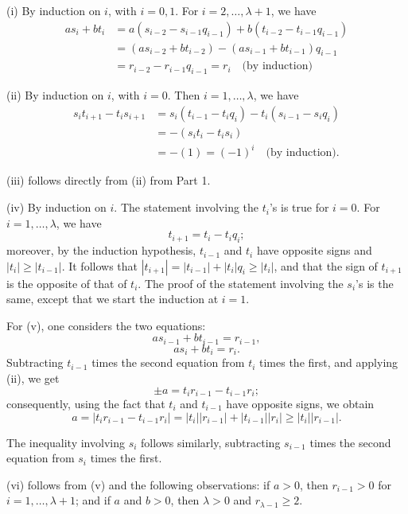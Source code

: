 \begin{Proof} 
    (i) By induction on \( i \), with \( i = 0, 1 \). For \( i = 2, \dots, \lambda+1 \), we have
    \begin{align*}
        a s_i + b t_i &= a(s_{i-2} - s_{i-1} q_{i-1}) + b(t_{i-2} - t_{i-1} q_{i-1}) \\
        &= (a s_{i-2} + b t_{i-2}) - (a s_{i-1} + b t_{i-1}) q_{i-1} \\
        &= r_{i-2} - r_{i-1} q_{i-1} = r_i \quad \text{(by induction)}
    \end{align*}
    
    \noindent
    (ii) By induction on \( i \), with \( i = 0 \). Then \( i = 1, \dots, \lambda \), we have
    \begin{align*}
        s_i t_{i+1} - t_i s_{i+1} &= s_i(t_{i-1} - t_i q_i) - t_i(s_{i-1} - s_i q_i) \\
        &= -(s_i t_i - t_i s_i) \\
        &= -(1) = (-1)^i \quad \text{(by induction)}.
    \end{align*}
\end{Proof}

\begin{Proof}

    (iii) follows directly from (ii) from Part 1.

    \noindent
    (iv) By induction on \( i \). The statement involving the \( t_i \)'s is true for \( i = 0 \). For \( i = 1, \dots, \lambda \), we have
    \[
    t_{i+1} = t_i - t_i q_i;
    \]
    moreover, by the induction hypothesis, \( t_{i-1} \) and \( t_i \) have opposite signs and \( |t_i| \geq |t_{i-1}| \). It follows that \( |t_{i+1}| = |t_{i-1}| + |t_i| q_i \geq |t_i| \), and that the sign of \( t_{i+1} \) is the opposite of that of \( t_i \). The proof of the statement involving the \( s_i \)'s is the same, except that we start the induction at \( i = 1 \).

    \noindent
    For (v), one considers the two equations:
    \[
    a s_{i-1} + b t_{i-1} = r_{i-1},
    \]
    \[
    a s_i + b t_i = r_i.
    \]
    Subtracting \( t_{i-1} \) times the second equation from \( t_i \) times the first, and applying (ii), we get
    \[
    \pm a = t_i r_{i-1} - t_{i-1} r_i;
    \]
    consequently, using the fact that \( t_i \) and \( t_{i-1} \) have opposite signs, we obtain
    \[
    a = |t_i r_{i-1} - t_{i-1} r_i| = |t_i| |r_{i-1}| + |t_{i-1}| |r_i| \geq |t_i| |r_{i-1}|.
    \]

    The inequality involving \( s_i \) follows similarly, subtracting \( s_{i-1} \) times the second equation from \( s_i \) times the first.

    \noindent
    (vi) follows from (v) and the following observations: if \( a > 0 \), then \( r_{i-1} > 0 \) for \( i = 1, \dots, \lambda + 1 \); and if \( a \) and \( b > 0 \), then \( \lambda > 0 \) and \( r_{\lambda-1} \geq 2 \).

\end{Proof}

